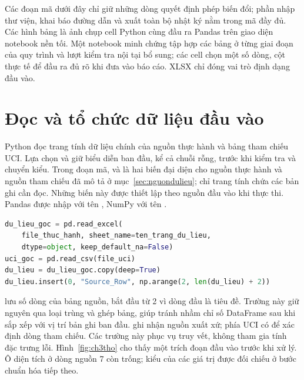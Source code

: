Các đoạn mã dưới đây chỉ giữ những dòng quyết định phép biến đổi; phần nhập thư viện, khai báo đường dẫn và xuất toàn bộ nhật ký nằm trong mã đầy đủ. Các hình bảng là ảnh chụp cell Python cùng đầu ra Pandas trên giao diện notebook nền tối. Một notebook minh chứng tập hợp các bảng ở từng giai đoạn của quy trình và lượt kiểm tra nội tại bổ sung; các cell chọn một số dòng, cột thực tế để đầu ra đủ rõ khi đưa vào báo cáo. XLSX chỉ đóng vai trò định dạng đầu vào.

\section{Đọc và tổ chức dữ liệu đầu vào}
\label{sec:ch3docdulieu}

Python đọc trang tính dữ liệu chính của nguồn thực hành và bảng tham chiếu UCI. Lựa chọn  và  giữ biểu diễn ban đầu, kể cả chuỗi rỗng, trước khi kiểm tra và chuyển kiểu. Trong đoạn mã,  và  là hai biến đại diện cho nguồn thực hành và nguồn tham chiếu đã mô tả ở mục~\ref{sec:nguondulieu};  chỉ trang tính chứa các bản ghi cần đọc. Những biến này được thiết lập theo nguồn đầu vào khi thực thi. Pandas được nhập với tên , NumPy với tên .

\noindent\begin{minipage}{\linewidth}
\begin{lstlisting}[language=Python]
du_lieu_goc = pd.read_excel(
    file_thuc_hanh, sheet_name=ten_trang_du_lieu,
    dtype=object, keep_default_na=False)
uci_goc = pd.read_csv(file_uci)
du_lieu = du_lieu_goc.copy(deep=True)
du_lieu.insert(0, "Source_Row", np.arange(2, len(du_lieu) + 2))
\end{lstlisting}
\end{minipage}\par

 lưu số dòng của bảng nguồn, bắt đầu từ 2 vì dòng đầu là tiêu đề. Trường này giữ nguyên qua loại trùng và ghép bảng, giúp tránh nhầm chỉ số DataFrame sau khi sắp xếp với vị trí bản ghi ban đầu.  ghi nhận nguồn xuất xứ; phía UCI có  để xác định dòng tham chiếu. Các trường này phục vụ truy vết, không tham gia tính đặc trưng lỗi. Hình~\ref{fig:ch3tho} cho thấy một trích đoạn đầu vào trước khi xử lý. Ô diện tích ở dòng nguồn 7 còn trống; kiểu của các giá trị được đối chiếu ở bước chuẩn hóa tiếp theo.

